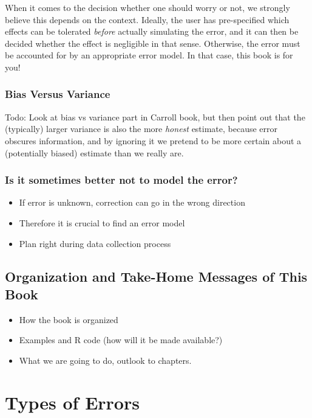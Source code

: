 \documentclass[]{book}
\providecommand{\tightlist}{%
  \setlength{\itemsep}{0pt}\setlength{\parskip}{0pt}}
\theoremstyle{definition}
\theoremstyle{definition}
\theoremstyle{definition}
\theoremstyle{remark}
\begin{document}
When it comes to the decision whether one should worry or not, we
strongly believe this depends on the context. Ideally, the user has
pre-specified which effects can be tolerated \emph{before} actually
simulating the error, and it can then be decided whether the effect is
negligible in that sense. Otherwise, the error must be accounted for by
an appropriate error model. In that case, this book is for you!

\subsection{Bias Versus Variance}\label{bias-versus-variance}

Todo: Look at bias vs variance part in Carroll book, but then point out
that the (typically) larger variance is also the more \emph{honest}
estimate, because error obscures information, and by ignoring it we
pretend to be more certain about a (potentially biased) estimate than we
really are.

\subsection{Is it sometimes better not to model the
error?}\label{is-it-sometimes-better-not-to-model-the-error}

\begin{itemize}
\tightlist
\item
  If error is unknown, correction can go in the wrong direction
\item
  Therefore it is crucial to find an error model
\item
  Plan right during data collection process
\end{itemize}

\section{Organization and Take-Home Messages of This
Book}\label{organization-and-take-home-messages-of-this-book}

\begin{itemize}
\tightlist
\item
  How the book is organized
\item
  Examples and R code (how will it be made available?)
\item
  What we are going to do, outlook to chapters.
\end{itemize}

\chapter{Types of Errors}\label{types-of-errors}
\end{document}
